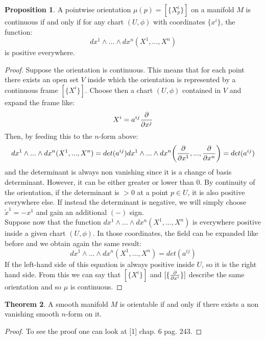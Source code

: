 \documentclass[12pt,a4paper]{report}
\theoremstyle{definition}
\newtheorem{Def}{Definition}[chapter]
\theoremstyle{Theorem}
\newtheorem{Theo}[Def]{Theorem}
\newtheorem{Prop}[Def]{Proposition}
\theoremstyle{definition}
\theoremstyle{definition}
\begin{document}
	\begin{Prop}
		A pointwise orientation $\mu(p)=[\{X^i_p\}]$ on a manifold $M$ is continuous if and only if for any chart $(U,\phi)$ with coordinates $\{x^i\}$, the function:
		$$dx^1\wedge...\wedge dx^n(X^1,...,X^n)$$
		is positive everywhere.
	\end{Prop}
	\begin{proof}
		Suppose the orientation is continuous. This means that for each point there exists an open set $V$ inside which the orientation is represented by a continuous frame $[\{X^i\}]$. Choose then a chart $(U,\phi)$ contained in $V$ and expand the frame like:
		$$X^i=a^{ij}{\partial\over \partial x^j}$$
		Then, by feeding this to the $n$-form above:
		$$dx^1\wedge...\wedge dx^n(X^1,...,X^n)=det(a^{ij})dx^1\wedge...\wedge dx^n\bigg({\partial\over \partial x^1},...,{\partial\over \partial x^n}\bigg)=det(a^{ij})$$
		and the determinant is always non vanishing since it is a change of basis determinant. However, it can be either greater or lower than 0. By continuity of the orientation, if the determinant is $>0$ at a point $p\in U$, it is also positive everywhere else. If instead the determinant is negative, we will simply choose $\tilde{x}^1=-x^1$ and gain an additional $(-)$ sign.\\
		Suppose now that the function $dx^1\wedge...\wedge dx^n(X^1,...,X^n)$ is everywhere positive inside a given chart $(U,\phi)$. In those coordinates, the field can be expanded like before and we obtain again the same result:
		$$dx^1\wedge...\wedge dx^n(X^1,...,X^n)=det(a^{ij})$$
		If the left-hand side of this equation is always positive inside $U$, so it is the right hand side. From this we can say that $[\{X^i\}]$ and $[\{{\partial\over\partial x^i}\}]$ describe the same orientation and so $\mu$ is continuous.
	\end{proof}
	\begin{Theo}
		A smooth manifold $M$ is orientable if and only if there exists a non vanishing smooth $n$-form on it.
	\end{Theo}
	\begin{proof}
		To see the proof one can look at [1] chap. 6 pag. 243.
	\end{proof}
	\begin{comment}
	We now define a very important form on metric manifolds, called volume form. This will be crucial in the definition of the Hodge operator.
	\begin{Def}
		Let $(M,g)$ be a smooth metric manifold and $(U,\phi)$ a chart with coordinates $\partial\over \partial x^i$. We define the volume form as:
		$$\omega=\sqrt{|det(g^{ij})|}dx^1\wedge...\wedge dx^n$$
	\end{Def}
	This is clearly a nowhere vanishing form. It can be shown that, by applying the Gram–Schmidt process, the volume form takes the simpler form:
	$$\omega=de^1\wedge...\wedge de^n$$
	where $e^i$ is the orthonormal basis with respect to $g$ inside $U$. The proof is just a straightforward calculation and can be found in [2] chap. 3 pag. 134.
	\end{comment}
\end{document}
